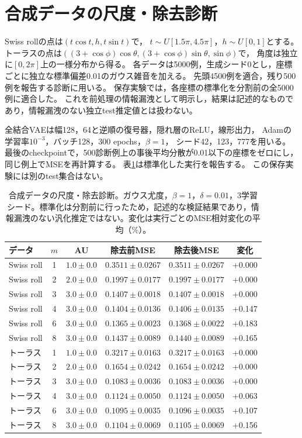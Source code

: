 \documentclass[11pt,a4paper]{ltjsarticle}
\begin{document}
\section{合成データの尺度・除去診断}\label{app:synthetic}
Swiss rollの点は$(t\cos t,h,t\sin t)$で，
$t\sim U[1.5\pi,4.5\pi]$，$h\sim U[0,1]$とする。
トーラスの点は$((3+\cos\phi)\cos\theta,(3+\cos\phi)\sin\theta,\sin\phi)$で，
角度は独立に$[0,2\pi]$上の一様分布から得る。
各データは5000例，生成シード0とし，座標ごとに独立な標準偏差0.01のガウス雑音を加える。
先頭4500例を適合，残り500例を報告する診断に用いる。
保存実験では，各座標の標準化を分割前の全5000例に適合した。
これを前処理の情報漏洩として明示し，結果は記述的なものであり，情報漏洩のない独立test推定値とは扱わない。

全結合VAEは幅128，64と逆順の復号器，隠れ層のReLU，線形出力，
Adamの学習率$10^{-3}$，バッチ128，300 epochs，$\beta=1$，
シード42，123，777を用いる。
最後のcheckpointで，500診断例上の事後平均分散が0.01以下の座標をゼロにし，
同じ例上でMSEを再計算する。
表\ref{tab:synthetic}は標準化した実行を報告する。
この保存実験には別のtest集合はない。

\begin{table}[H]
\caption{合成データの尺度・除去診断。ガウス尤度，$\beta=1$，$\delta=0.01$，3学習シード。標準化は分割前に行ったため，記述的な検証結果であり，情報漏洩のない汎化推定ではない。変化は実行ごとのMSE相対変化の平均（\%）。}\label{tab:synthetic}
\footnotesize
\setlength{\tabcolsep}{3.5pt}
\begin{tabular*}{\textwidth}{@{\extracolsep{\fill}}lccccc@{}}
\toprule
データ & $m$ & AU & 除去前MSE & 除去後MSE & 変化 \\
\midrule
Swiss roll & 1 & $1.0 \pm 0.0$ & $0.3511 \pm 0.0267$ & $0.3511 \pm 0.0267$ & +0.000 \\
Swiss roll & 2 & $2.0 \pm 0.0$ & $0.1997 \pm 0.0177$ & $0.1997 \pm 0.0177$ & +0.000 \\
Swiss roll & 3 & $3.0 \pm 0.0$ & $0.1407 \pm 0.0018$ & $0.1407 \pm 0.0018$ & +0.000 \\
Swiss roll & 4 & $3.0 \pm 0.0$ & $0.1404 \pm 0.0136$ & $0.1406 \pm 0.0135$ & +0.147 \\
Swiss roll & 6 & $3.0 \pm 0.0$ & $0.1365 \pm 0.0023$ & $0.1368 \pm 0.0022$ & +0.183 \\
Swiss roll & 8 & $3.0 \pm 0.0$ & $0.1437 \pm 0.0089$ & $0.1440 \pm 0.0089$ & +0.165 \\
トーラス & 1 & $1.0 \pm 0.0$ & $0.3217 \pm 0.0163$ & $0.3217 \pm 0.0163$ & +0.000 \\
トーラス & 2 & $2.0 \pm 0.0$ & $0.1654 \pm 0.0242$ & $0.1654 \pm 0.0242$ & +0.000 \\
トーラス & 3 & $3.0 \pm 0.0$ & $0.1083 \pm 0.0036$ & $0.1083 \pm 0.0036$ & +0.000 \\
トーラス & 4 & $3.0 \pm 0.0$ & $0.1124 \pm 0.0050$ & $0.1124 \pm 0.0050$ & +0.063 \\
トーラス & 6 & $3.0 \pm 0.0$ & $0.1095 \pm 0.0035$ & $0.1096 \pm 0.0035$ & +0.107 \\
トーラス & 8 & $3.0 \pm 0.0$ & $0.1104 \pm 0.0069$ & $0.1105 \pm 0.0069$ & +0.156 \\
\bottomrule
\end{tabular*}
\end{table}
\end{document}
